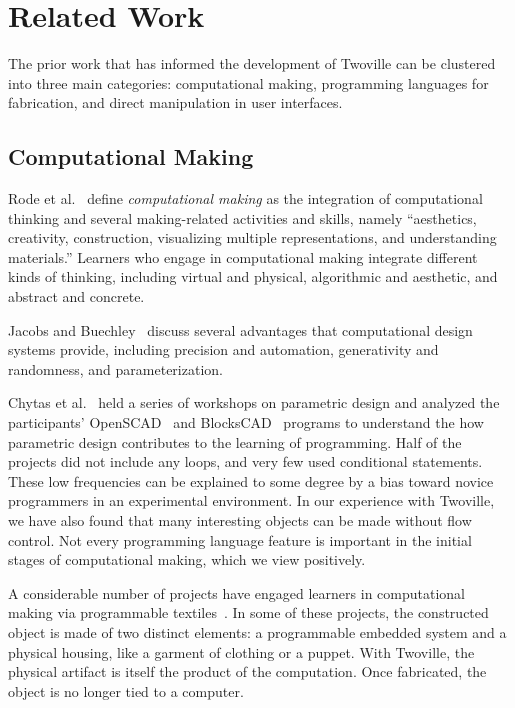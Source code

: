 \section{Related Work}
\label{section:related_work}

The prior work that has informed the development of Twoville can be clustered into three main categories: computational making, programming languages for fabrication, and direct manipulation in user interfaces.

\subsection{Computational Making}
Rode et al.~\cite{rode15ctcm} define \textit{computational making} as the integration of computational thinking and several making-related activities and skills, namely ``aesthetics, creativity, construction, visualizing multiple representations, and understanding materials.'' Learners who engage in computational making integrate different kinds of thinking, including virtual and physical, algorithmic and aesthetic, and abstract and concrete.

Jacobs and Buechley~\cite{jacobs13codeable} discuss several advantages that computational design systems provide, including precision and automation, generativity and randomness, and parameterization.

Chytas et al.~\cite{chytas2018learning} held a series of workshops on parametric design and analyzed the participants' OpenSCAD~\cite{openscad} and BlocksCAD~\cite{blockscad} programs to understand the how parametric design contributes to the learning of programming. Half of the projects did not include any loops, and very few used conditional statements. These low frequencies can be explained to some degree by a bias toward novice programmers in an experimental environment. In our experience with Twoville, we have also found that many interesting objects can be made without flow control. Not every programming language feature is important in the initial stages of computational making, which we view positively.

A considerable number of projects have engaged learners in computational making via programmable textiles~\cite{rode15ctcm,buechley10lilypad,kafai14crafts}. In some of these projects, the constructed object is made of two distinct elements: a programmable embedded system and a physical housing, like a garment of clothing or a puppet. With Twoville, the physical artifact is itself the product of the computation. Once fabricated, the object is no longer tied to a computer.

